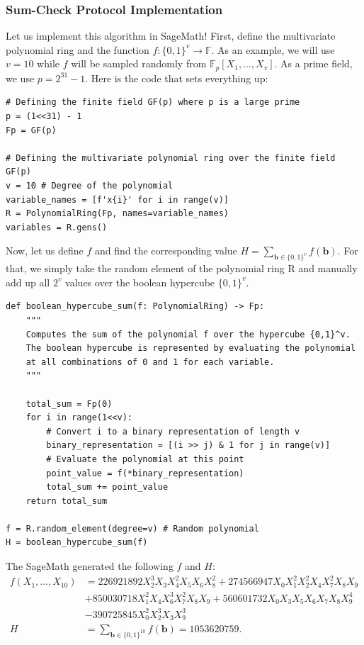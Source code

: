 \documentclass[../../book.tex]{subfiles}
\begin{document}
\subsubsection{Sum-Check Protocol Implementation}

Let us implement this algorithm in SageMath! First, define the multivariate
polynomial ring and the function $f: \{0,1\}^v \to \mathbb{F}$. As an example,
we will use $v=10$ while $f$ will be sampled randomly from
$\mathbb{F}_p[X_1,\dots,X_v]$. As a prime field, we use $p=2^{31} - 1$. 
Here is the code that sets everything up:
\begin{verbatim}
# Defining the finite field GF(p) where p is a large prime
p = (1<<31) - 1
Fp = GF(p)

# Defining the multivariate polynomial ring over the finite field GF(p)
v = 10 # Degree of the polynomial
variable_names = [f'x{i}' for i in range(v)]
R = PolynomialRing(Fp, names=variable_names)
variables = R.gens()
\end{verbatim}

Now, let us define $f$ and find the corresponding value $H =
\sum_{\boldsymbol{b} \in \{0,1\}^v} f(\boldsymbol{b})$. For that, we
simply take the random element of the polynomial ring \textsf{R} and 
manually add up all $2^v$ values over the boolean hypercube $\{0,1\}^v$.
\begin{verbatim}
def boolean_hypercube_sum(f: PolynomialRing) -> Fp:
    """
    Computes the sum of the polynomial f over the hypercube {0,1}^v.
    The boolean hypercube is represented by evaluating the polynomial
    at all combinations of 0 and 1 for each variable.
    """

    total_sum = Fp(0)
    for i in range(1<<v):
        # Convert i to a binary representation of length v
        binary_representation = [(i >> j) & 1 for j in range(v)]
        # Evaluate the polynomial at this point
        point_value = f(*binary_representation)
        total_sum += point_value
    return total_sum

f = R.random_element(degree=v) # Random polynomial
H = boolean_hypercube_sum(f)
\end{verbatim}

The SageMath generated the following $f$ and $H$:
\begin{align*}
    f(X_1,\dots,X_{10}) &= 226921892X_2^3X_3X_4^2X_5X_6X_8^2 + 274566947X_0X_1^2X_2^2X_4X_7^2X_8X_9 \\ 
    &+ 850030718X_1^2X_4X_6^3X_7^2X_8X_9 + 560601732X_0X_3X_5X_6X_7X_8X_9^4 \\
    &- 390725845X_0^2X_2^3X_3X_9^3 \\
    H &= \sum_{\boldsymbol{b} \in \{0,1\}^{10}} f(\boldsymbol{b}) = 1053620759.
\end{align*}
\end{document}
